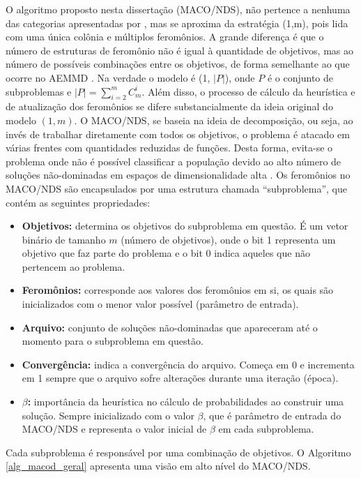 O algoritmo proposto nesta dissertação (MACO/NDS), não pertence a nenhuma das categorias apresentadas por \cite{Alaya2007}, mas se aproxima da estratégia (1,m), pois lida com uma única colônia e múltiplos feromônios. A grande diferença é que o número de estruturas de feromônio não é igual à quantidade de objetivos, mas ao número de possíveis combinações entre os objetivos, de forma semelhante ao que ocorre no AEMMD \cite{Lafeta2017}. Na verdade o modelo é (1, $|P|$), onde $P$ é o conjunto de subproblemas e $|P| = \sum_{i = 2}^m C_m^i$. Além disso, o processo de cálculo da heurística e de atualização dos feromônios se difere substancialmente da ideia original do modelo $(1,m)$. O MACO/NDS, se baseia na ideia de decomposição, ou seja, ao invés de trabalhar diretamente com todos os objetivos, o problema é atacado em várias frentes com quantidades reduzidas de funções. Desta forma, evita-se o problema onde não é possível classificar a população devido ao alto número de soluções não-dominadas em espaços de dimensionalidade alta \cite{Deb2014}. Os feromônios no MACO/NDS são encapsulados por uma estrutura chamada ``subproblema'', que contém as seguintes propriedades: 

\begin{itemize}
	\item \textbf{Objetivos:} determina os objetivos do subproblema em questão. É um vetor binário de tamanho $m$ (número de objetivos), onde o bit 1 representa um objetivo que faz parte do problema e o bit 0 indica aqueles que não pertencem ao problema.
	\item \textbf{Feromônios:} corresponde aos valores dos feromônios em si, os quais são inicializados com o menor valor possível (parâmetro de entrada).
	\item \textbf{Arquivo:} conjunto de soluções não-dominadas que apareceram até o momento para o subproblema em questão.
	\item \textbf{Convergência:} indica a convergência do arquivo. Começa em 0 e incrementa em 1 sempre que o arquivo sofre alterações durante uma iteração (época).
	\item \textbf{$\beta$:} importância da heurística no cálculo de probabilidades ao construir uma solução. Sempre inicializado com o valor $\beta$, que é parâmetro de entrada do MACO/NDS e representa o valor inicial de $\beta$ em cada subproblema.
\end{itemize}

Cada subproblema é responsável por uma combinação de objetivos. O Algoritmo \ref{alg_macod_geral} apresenta uma visão em alto nível do MACO/NDS.

